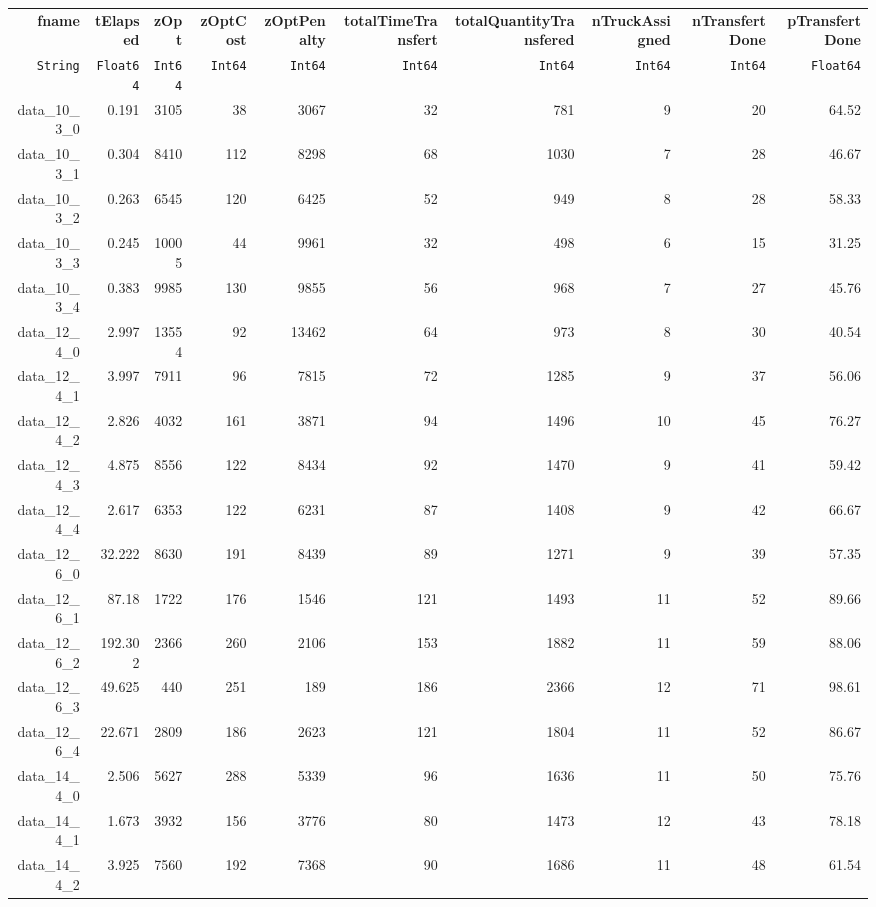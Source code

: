 \begin{tabular}{rrrrrrrrrr}
  \hline
  \textbf{fname} & \textbf{tElapsed} & \textbf{zOpt} & \textbf{zOptCost} & \textbf{zOptPenalty} & \textbf{totalTimeTransfert} & \textbf{totalQuantityTransfered} & \textbf{nTruckAssigned} & \textbf{nTransfertDone} & \textbf{pTransfertDone} \\
  \texttt{String} & \texttt{Float64} & \texttt{Int64} & \texttt{Int64} & \texttt{Int64} & \texttt{Int64} & \texttt{Int64} & \texttt{Int64} & \texttt{Int64} & \texttt{Float64} \\\hline
  data\_10\_3\_0 & 0.191 & 3105 & 38 & 3067 & 32 & 781 & 9 & 20 & 64.52 \\
  data\_10\_3\_1 & 0.304 & 8410 & 112 & 8298 & 68 & 1030 & 7 & 28 & 46.67 \\
  data\_10\_3\_2 & 0.263 & 6545 & 120 & 6425 & 52 & 949 & 8 & 28 & 58.33 \\
  data\_10\_3\_3 & 0.245 & 10005 & 44 & 9961 & 32 & 498 & 6 & 15 & 31.25 \\
  data\_10\_3\_4 & 0.383 & 9985 & 130 & 9855 & 56 & 968 & 7 & 27 & 45.76 \\
  data\_12\_4\_0 & 2.997 & 13554 & 92 & 13462 & 64 & 973 & 8 & 30 & 40.54 \\
  data\_12\_4\_1 & 3.997 & 7911 & 96 & 7815 & 72 & 1285 & 9 & 37 & 56.06 \\
  data\_12\_4\_2 & 2.826 & 4032 & 161 & 3871 & 94 & 1496 & 10 & 45 & 76.27 \\
  data\_12\_4\_3 & 4.875 & 8556 & 122 & 8434 & 92 & 1470 & 9 & 41 & 59.42 \\
  data\_12\_4\_4 & 2.617 & 6353 & 122 & 6231 & 87 & 1408 & 9 & 42 & 66.67 \\
  data\_12\_6\_0 & 32.222 & 8630 & 191 & 8439 & 89 & 1271 & 9 & 39 & 57.35 \\
  data\_12\_6\_1 & 87.18 & 1722 & 176 & 1546 & 121 & 1493 & 11 & 52 & 89.66 \\
  data\_12\_6\_2 & 192.302 & 2366 & 260 & 2106 & 153 & 1882 & 11 & 59 & 88.06 \\
  data\_12\_6\_3 & 49.625 & 440 & 251 & 189 & 186 & 2366 & 12 & 71 & 98.61 \\
  data\_12\_6\_4 & 22.671 & 2809 & 186 & 2623 & 121 & 1804 & 11 & 52 & 86.67 \\
  data\_14\_4\_0 & 2.506 & 5627 & 288 & 5339 & 96 & 1636 & 11 & 50 & 75.76 \\
  data\_14\_4\_1 & 1.673 & 3932 & 156 & 3776 & 80 & 1473 & 12 & 43 & 78.18 \\
  data\_14\_4\_2 & 3.925 & 7560 & 192 & 7368 & 90 & 1686 & 11 & 48 & 61.54 \\

\end{tabular}
